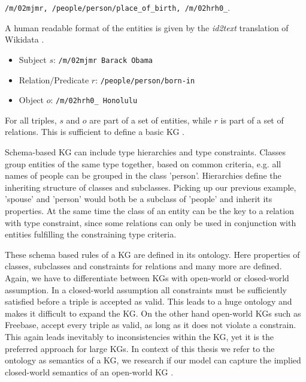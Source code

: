 \begin{center}
    \texttt{/m/02mjmr, /people/person/place\_of\_birth, /m/02hrh0\_}.
\end{center}



A human readable format of the entities is given by the \textit{id2text} translation of Wikidata \cite{vrandevcic2014wikidata}.

\begin{itemize}
    \item Subject $s$:   \texttt{/m/02mjmr Barack Obama}
    \item Relation/Predicate $r$:    \texttt{/people/person/born-in}
    \item Object $o$:     \texttt{/m/02hrh0\_ Honolulu}
\end{itemize}


For all triples, $s$ and $o$ are part of a set of entities, while $r$ is part of a set of relations. This is sufficient to define a basic KG \cite{nickel_review_2016}.

Schema-based KG can include type hierarchies and type constraints. Classes group entities of the same type together, based on common criteria, e.g. all names of people can be grouped in the class 'person'. Hierarchies define the inheriting structure of classes and subclasses. Picking up our previous example, 'spouse' and 'person' would both be a subclass of 'people' and inherit its properties. At the same time the class of an entity can be the key to a relation with type constraint, since some relations can only be used in conjunction with entities fulfilling the constraining type criteria.

These schema based rules of a KG are defined in its ontology. Here properties of classes, subclasses and constraints for relations and many more are defined. Again, we have to differentiate between KGs with open-world or closed-world assumption. In a closed-world assumption all constraints must be sufficiently satisfied before a triple is accepted as valid. This leads to a huge ontology and makes it difficult to expand the KG. On the other hand open-world KGs such as Freebase, accept every triple as valid, as long as it does not violate a constrain. This again leads inevitably to inconsistencies within the KG, yet it is the preferred approach for large KGs. In context of this thesis we refer to the ontology as semantics of a KG, we research if our model can capture the implied closed-world semantics of an open-world KG \cite{nickel_review_2016}.

